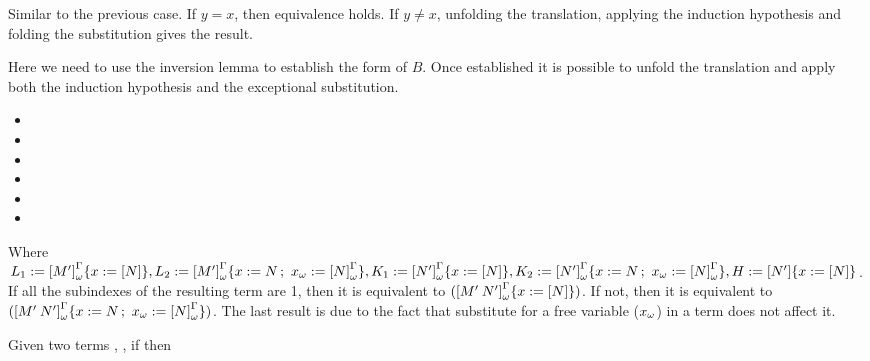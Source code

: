 \begin{Proof}
\begin{ProofCase}{\M{} \termDef{} }
Similar to the previous case. If $y = x$, then equivalence holds. If $y \neq x$, unfolding the translation, 
applying the induction hypothesis and folding the substitution gives the result.
\end{ProofCase}

\begin{ProofCase}{\M{} \termDef{} }
Here we need to use the inversion lemma to establish the form of $B$. Once established it is possible to unfold
the translation and apply both the induction hypothesis and the exceptional substitution.
\newcommand{\substEnv}[0]{\ensuremath{\{x\termDef{} \Trans{N}\}}}
\newcommand{\substEnvv}[0]{\ensuremath{\{x\termDef{} N\,;\ \WTermTrans{x}\termDef\WParamTrans{N}\}}}
\begin{itemize}[noitemsep]
    
    \item {}
    \item {}
    \item {}
    \item {}
    \item {}
    \item {}
\end{itemize}
Where $L_1\termDef\WParamTrans{M'}\substEnv, L_2\termDef\WParamTrans{M'}\substEnvv,
K_1\termDef\WParamTrans{N'}\substEnv, K_2\termDef\WParamTrans{N'}\substEnvv, H\termDef\Trans{N'}\substEnv$.\\
If all the subindexes of the resulting term are 1, then it is equivalent to
$(\WParamTrans{\app{M'}{N'}}\substEnv)$. If not, then it is equivalent 
to $(\WParamTrans{\app{M'}{N'}}\substEnvv)$. The last result
is due to the fact that substitute for a free variable ($x_{\omega}$) in a term does not affect it. 
\end{ProofCase}
\end{Proof}

\begin{Lemma}[Conversion]
\label{lemma:conversion}
Given two terms , , if \convertible{\M{}}{\N{}} then
\convertible{\WParamTrans{\M{}}}{\WParamTrans{\N{}}}
\end{Lemma}

